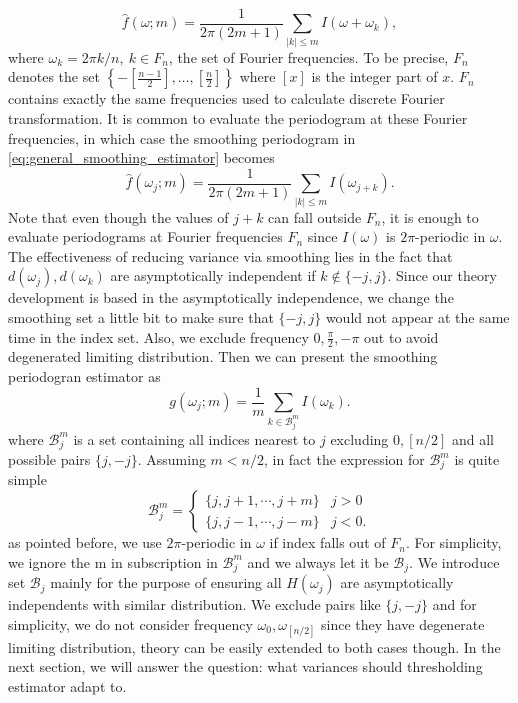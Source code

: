\begin{equation}
\label{eq:general_smoothing_estimator}
    \hat{f}(\omega; m) = \frac{1}{2\pi(2m+1)} \sum_{|k|\le m} I(\omega+\omega_k),
\end{equation}
where $\omega_k = 2\pi k/n, ~ k\in F_n$,  the set of Fourier frequencies. To be precise, $F_n$ denotes the set  $\left\{-[\frac{n-1}{2}], \dots, [\frac{n}{2}]\right\}$ where $[x]$ is the integer part of $x$. $F_n$ contains exactly the same frequencies used to calculate discrete Fourier transformation. It is common to evaluate the periodogram at these Fourier frequencies, in which case the smoothing periodogram in \eqref{eq:general_smoothing_estimator} becomes
\begin{equation}
\label{eq:smoothing estimator}
    \hat{f}(\omega_j; m) = \frac{1}{2\pi(2m+1)} \sum_{|k|\le m} I(\omega_{j+k}).
\end{equation}
Note that even though the values of $j+k$ can fall outside $F_n$, it is enough to evaluate periodograms at Fourier frequencies $F_n$ since $I(\omega)$ is $2\pi$-periodic in $\omega$. The effectiveness of reducing variance via smoothing lies in the fact that $d(\omega_j), d(\omega_k)$ are asymptotically independent if $k\notin \{-j, j\}$. Since our theory development is based in the asymptotically independence, we change the smoothing set a little bit to make sure that $\{-j, j\}$ would not appear at the same time in the index set. Also, we exclude frequency $0, \frac{\pi}{2}, -\pi$ out to avoid degenerated limiting distribution. Then we can present the smoothing periodogran estimator as 
\begin{equation}
g(\omega_j; m) = \frac{1}{m}\sum_{ k\in \mathcal{B}_j^m} I(\omega_k). 
\end{equation}
where $\mathcal{B}_j^m$ is a set containing all indices nearest to $j$ excluding $0, [n/2]$ and all possible pairs $\{j, -j\}$. Assuming $m<n/2$,
in fact the expression for $\mathcal{B}_j^m$ is quite simple
\begin{equation}
\label{eq:def_neb}
\mathcal{B}_j^m = 
\begin{cases}
\{j, j+1, \cdots, j+m\}& j>0 \\
\{j, j-1, \cdots, j-m\}& j<0.
\end{cases}
\end{equation}
as pointed before, we use $2\pi$-periodic in $\omega$ if index falls out of $F_n$. For simplicity, we ignore the m in subscription in $\mathcal{B}_j^m$ and we always let it be $\mathcal{B}_j$. We introduce set $\mathcal{B}_j$ mainly for the purpose of ensuring all $H(\omega_j)$ are asymptotically independents with similar distribution. We exclude pairs like $\{j, -j \}$ and for simplicity, we do not consider frequency $\omega_0, \omega_{[n/2]}$ since they have degenerate limiting distribution, theory can be easily extended to both cases though. In the next section, we will answer the question: what variances should thresholding estimator adapt to. \par 


